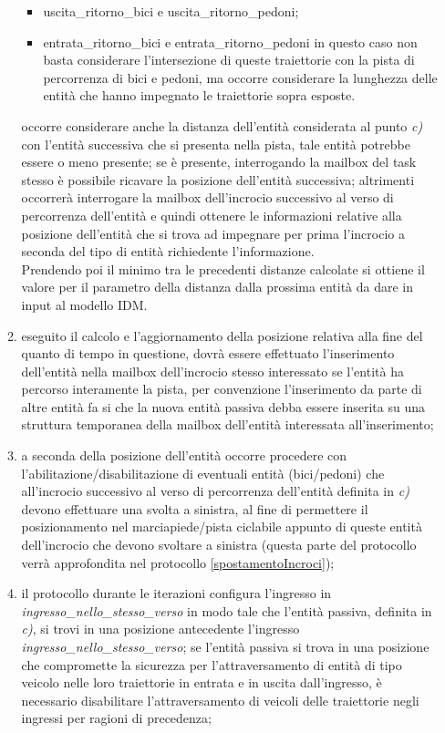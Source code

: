 \begin{enumerate}
\begin{enumerate}
\begin{itemize}
\item usci\-ta\_ri\-tor\-no\_bi\-ci e usci\-ta\_ri\-tor\-no\_pe\-do\-ni;
\item en\-tra\-ta\_ritorno\_bici e en\-tra\-ta\_ri\-tor\-no\_pe\-do\-ni in questo caso non basta considerare l'intersezione di queste traiettorie con la pista di percorrenza di bici e pedoni, ma occorre considerare la lunghezza delle entità che hanno impegnato le traiettorie sopra esposte.
\end{itemize}
occorre considerare anche la distanza dell'entità considerata al punto \textit{c)} con l'entità successiva che si presenta nella pista, tale entità potrebbe essere o meno presente; se è presente, interrogando la mailbox del task stesso è possibile ricavare la posizione dell'entità successiva; altrimenti occorrerà interrogare la mailbox dell'incrocio successivo al verso di percorrenza dell'entità e quindi ottenere le informazioni relative alla posizione dell'entità che si trova ad impegnare per prima l'incrocio a seconda del tipo di entità richiedente l'informazione.\\
Prendendo poi il minimo tra le precedenti distanze calcolate si ottiene il valore per il parametro della distanza dalla prossima entità da dare in input al modello IDM.
\item eseguito il calcolo e l'aggiornamento della posizione relativa alla fine del quanto di tempo in questione, dovrà essere effettuato l'inserimento dell'entità nella mailbox dell'incrocio stesso interessato se l'entità ha percorso interamente la pista, per convenzione l'inserimento da parte di altre entità fa si che la nuova entità passiva debba essere inserita su una struttura temporanea della mailbox dell'entità interessata all'inserimento;
\item a seconda della posizione dell'entità occorre procedere con l'abilitazione/disabilitazione di eventuali entità (bici/pedoni) che all'incrocio successivo al verso di percorrenza dell'entità definita in \textit{c)} devono effettuare una svolta a sinistra, al fine di permettere il posizionamento nel marciapiede/pista ciclabile appunto di queste entità dell'incrocio che devono svoltare a sinistra (questa parte del protocollo verrà approfondita nel protocollo \ref{spostamentoIncroci});
\item il protocollo durante le iterazioni configura l'ingresso in \textit{ingres\-so\_nel\-lo\_stes\-so\_ver\-so} in modo tale che l'entità passiva, definita in \textit{c)}, si trovi in una posizione antecedente l'ingresso \textit{ingres\-so\_nel\-lo\_stes\-so\_ver\-so}; se l'entità passiva si trova in una posizione che compromette la sicurezza per l'attraversamento di entità di tipo veicolo nelle loro traiettorie in entrata e in uscita dall'ingresso, è necessario disabilitare l'attraversamento di veicoli delle traiettorie negli ingressi per ragioni di precedenza;

\end{enumerate}
\end{enumerate}

